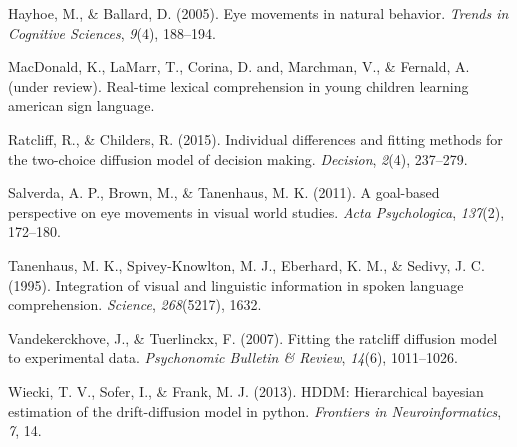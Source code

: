 \documentclass[10pt, letterpaper]{article}
\begin{document}
\hypertarget{ref-hayhoe2005eye}{}
Hayhoe, M., \& Ballard, D. (2005). Eye movements in natural behavior.
\emph{Trends in Cognitive Sciences}, \emph{9}(4), 188--194.

\hypertarget{ref-macdonald2017realtime}{}
MacDonald, K., LaMarr, T., Corina, D. and, Marchman, V., \& Fernald, A.
(under review). Real-time lexical comprehension in young children
learning american sign language.

\hypertarget{ref-ratcliff2015individual}{}
Ratcliff, R., \& Childers, R. (2015). Individual differences and fitting
methods for the two-choice diffusion model of decision making.
\emph{Decision}, \emph{2}(4), 237--279.

\hypertarget{ref-salverda2011goal}{}
Salverda, A. P., Brown, M., \& Tanenhaus, M. K. (2011). A goal-based
perspective on eye movements in visual world studies. \emph{Acta
Psychologica}, \emph{137}(2), 172--180.

\hypertarget{ref-tanenhaus1995integration}{}
Tanenhaus, M. K., Spivey-Knowlton, M. J., Eberhard, K. M., \& Sedivy, J.
C. (1995). Integration of visual and linguistic information in spoken
language comprehension. \emph{Science}, \emph{268}(5217), 1632.

\hypertarget{ref-vandekerckhove2007fitting}{}
Vandekerckhove, J., \& Tuerlinckx, F. (2007). Fitting the ratcliff
diffusion model to experimental data. \emph{Psychonomic Bulletin \&
Review}, \emph{14}(6), 1011--1026.

\hypertarget{ref-wiecki2013hddm}{}
Wiecki, T. V., Sofer, I., \& Frank, M. J. (2013). HDDM: Hierarchical
bayesian estimation of the drift-diffusion model in python.
\emph{Frontiers in Neuroinformatics}, \emph{7}, 14.
\end{document}
